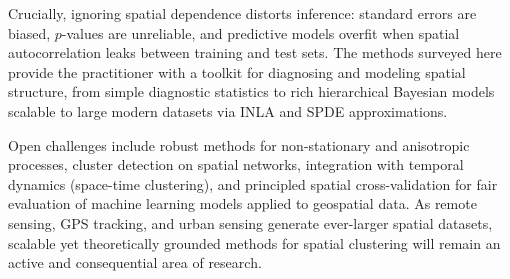 \documentclass[conference]{IEEEtran}
\theoremstyle{definition}
\begin{document}
Crucially, ignoring spatial dependence distorts inference: standard errors are biased, $p$-values are unreliable, and predictive models overfit when spatial autocorrelation leaks between training and test sets. The methods surveyed here provide the practitioner with a toolkit for diagnosing and modeling spatial structure, from simple diagnostic statistics to rich hierarchical Bayesian models scalable to large modern datasets via INLA and SPDE approximations.

Open challenges include robust methods for non-stationary and anisotropic processes, cluster detection on spatial networks, integration with temporal dynamics (space-time clustering), and principled spatial cross-validation for fair evaluation of machine learning models applied to geospatial data. As remote sensing, GPS tracking, and urban sensing generate ever-larger spatial datasets, scalable yet theoretically grounded methods for spatial clustering will remain an active and consequential area of research.
\end{document}
